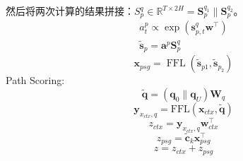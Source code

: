 \documentclass[a4paper,UTF8]{article}
\numberwithin{equation}{section}
\begin{document}
\begin{enumerate}
	然后将两次计算的结果拼接：$S_p^q\in \mathbb{R}^{T \times 2 H}=\mathbf{S}_{p}^{q_{1}} \| \mathbf{S}_{p}^{q_{2}}$。
	\begin{equation}
	\begin{array}{l}{a_{t}^{p} \propto \exp \left(\mathbf{s}_{p, t}^{q} \mathbf{w}^{\top}\right)} \\ {\tilde{\mathbf{s}}_{p}=\mathbf{a}^{p} \mathbf{S}_{p}^{q}}\end{array}
	\end{equation}
	\begin{equation}
		\mathbf{x}_{p s g}=\operatorname{FFL}\left(\tilde{\mathbf{s}}_{p 1}, \tilde{\mathbf{s}}_{p_{2}}\right)
		\end{equation}
	\subitem[3] Path Scoring:
	\begin{equation}
		\tilde{\mathbf{q}}=\left(\mathbf{q}_{0} \| \mathbf{q}_{U}\right) \mathbf{W}_{q}
		\end{equation}
		\begin{equation}
			\mathbf{y}_{x_{c t x}, q}=\mathrm{FFL}\left(\mathbf{x}_{c t x}, \tilde{\mathbf{q}}\right)
			\end{equation}
			\begin{equation}
				z_{c t x}=\mathbf{y}_{x_{c t x}, q} \mathbf{w}_{c t x}^{\top}
				\end{equation}
				\begin{equation}
					z_{p s g}=\tilde{\mathbf{c}}_{k} \mathbf{x}_{p s g}^{\top}
					\end{equation}
					\begin{equation}
						z=z_{c t x}+z_{p s g}
						\end{equation}
\end{enumerate}
\end{document}
